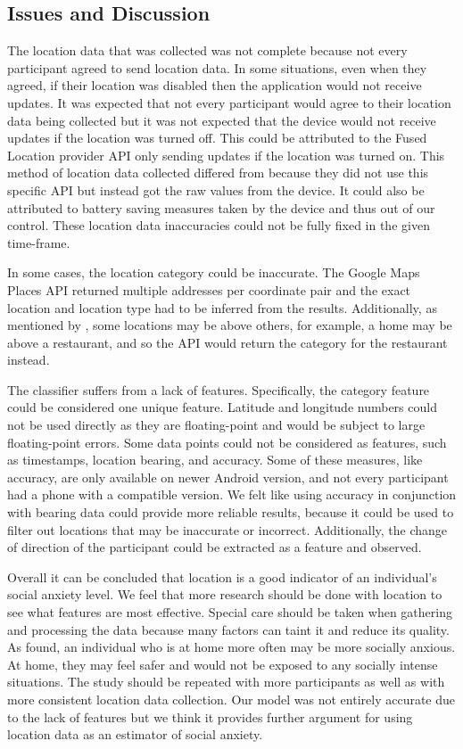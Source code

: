 \documentclass{l4proj}
\begin{document}
\subsection{Issues and Discussion}
The location data that was collected was not complete because not every participant agreed to send location data. In some situations, even when they agreed, if their location was disabled then the application would not receive updates. It was expected that not every participant would agree to their location data being collected but it was not expected that the device would not receive updates if the location was turned off. This could be attributed to the Fused Location provider API only sending updates if the location was turned on. This method of location data collected differed from \cite{wood} because they did not use this specific API but instead got the raw values from the device. It could also be attributed to battery saving measures taken by the device and thus out of our control. These location data inaccuracies could not be fully fixed in the given time-frame.

In some cases, the location category could be inaccurate. The Google Maps Places API returned multiple addresses per coordinate pair and the exact location and location type had to be inferred from the results. Additionally, as mentioned by \cite{wood}, some locations may be above others, for example, a home may be above a restaurant, and so the API would return the category for the restaurant instead.

The classifier suffers from a lack of features. Specifically, the category feature could be considered one unique feature. Latitude and longitude numbers could not be used directly as they are floating-point and would be subject to large floating-point errors. Some data points could not be considered as features, such as timestamps, location bearing, and accuracy. Some of these measures, like accuracy, are only available on newer Android version, and not every participant had a phone with a compatible version. We felt like using accuracy in conjunction with bearing data could provide more reliable results, because it could be used to filter out locations that may be inaccurate or incorrect. Additionally, the change of direction of the participant could be extracted as a feature and observed.

Overall it can be concluded that location is a good indicator of an individual's social anxiety level. We feel that more research should be done with location to see what features are most effective. Special care should be taken when gathering and processing the data because many factors can taint it and reduce its quality. As \cite{wood, boukhechba} found, an individual who is at home more often may be more socially anxious. At home, they may feel safer and would not be exposed to any socially intense situations. The study should be repeated with more participants as well as with more consistent location data collection. Our model was not entirely accurate due to the lack of features but we think it provides further argument for using location data as an estimator of social anxiety.
\end{document}
